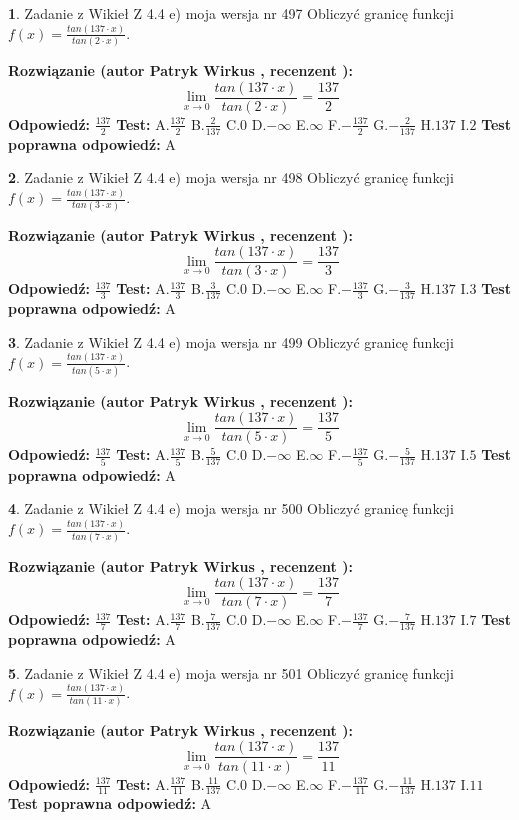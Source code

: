 \documentclass[12pt, a4paper]{article}
\theoremstyle{definition} %
\newtheorem{zad}{}
\newcommand{\zadStart}[1]{\begin{zad}#1\newline}
\newcommand{\zadStop}{\end{zad}}
\newcommand{\rozwStart}[2]{\noindent \textbf{Rozwiązanie (autor #1 , recenzent #2): }\newline}
\newcommand{\rozwStop}{\newline}
\newcommand{\odpStart}{\noindent \textbf{Odpowiedź:}\newline}
\newcommand{\odpStop}{\newline}
\newcommand{\testStart}{\noindent \textbf{Test:}\newline}
\newcommand{\testStop}{\newline}
\newcommand{\kluczStart}{\noindent \textbf{Test poprawna odpowiedź:}\newline}
\newcommand{\kluczStop}{\newline}
\begin{document}
\zadStart{Zadanie z Wikieł Z 4.4 e) moja wersja nr 497}
Obliczyć granicę funkcji $f(x)=\frac{tan(137\cdot x)}{tan(2\cdot x)}$.
\zadStop
\rozwStart{Patryk Wirkus}{}
$$\lim\limits_{x\to 0}\frac{tan(137\cdot x)}{tan(2\cdot x)}=
\frac{137}{2}$$
\rozwStop
\odpStart
$\frac{137}{2}$
\odpStop
\testStart
A.$\frac{137}{2}$
B.$\frac{2}{137}$
C.$0$
D.$-\infty$
E.$\infty$
F.$-\frac{137}{2}$
G.$-\frac{2}{137}$
H.$137$
I.$2$
\testStop
\kluczStart
A
\kluczStop



\zadStart{Zadanie z Wikieł Z 4.4 e) moja wersja nr 498}
Obliczyć granicę funkcji $f(x)=\frac{tan(137\cdot x)}{tan(3\cdot x)}$.
\zadStop
\rozwStart{Patryk Wirkus}{}
$$\lim\limits_{x\to 0}\frac{tan(137\cdot x)}{tan(3\cdot x)}=
\frac{137}{3}$$
\rozwStop
\odpStart
$\frac{137}{3}$
\odpStop
\testStart
A.$\frac{137}{3}$
B.$\frac{3}{137}$
C.$0$
D.$-\infty$
E.$\infty$
F.$-\frac{137}{3}$
G.$-\frac{3}{137}$
H.$137$
I.$3$
\testStop
\kluczStart
A
\kluczStop



\zadStart{Zadanie z Wikieł Z 4.4 e) moja wersja nr 499}
Obliczyć granicę funkcji $f(x)=\frac{tan(137\cdot x)}{tan(5\cdot x)}$.
\zadStop
\rozwStart{Patryk Wirkus}{}
$$\lim\limits_{x\to 0}\frac{tan(137\cdot x)}{tan(5\cdot x)}=
\frac{137}{5}$$
\rozwStop
\odpStart
$\frac{137}{5}$
\odpStop
\testStart
A.$\frac{137}{5}$
B.$\frac{5}{137}$
C.$0$
D.$-\infty$
E.$\infty$
F.$-\frac{137}{5}$
G.$-\frac{5}{137}$
H.$137$
I.$5$
\testStop
\kluczStart
A
\kluczStop



\zadStart{Zadanie z Wikieł Z 4.4 e) moja wersja nr 500}
Obliczyć granicę funkcji $f(x)=\frac{tan(137\cdot x)}{tan(7\cdot x)}$.
\zadStop
\rozwStart{Patryk Wirkus}{}
$$\lim\limits_{x\to 0}\frac{tan(137\cdot x)}{tan(7\cdot x)}=
\frac{137}{7}$$
\rozwStop
\odpStart
$\frac{137}{7}$
\odpStop
\testStart
A.$\frac{137}{7}$
B.$\frac{7}{137}$
C.$0$
D.$-\infty$
E.$\infty$
F.$-\frac{137}{7}$
G.$-\frac{7}{137}$
H.$137$
I.$7$
\testStop
\kluczStart
A
\kluczStop



\zadStart{Zadanie z Wikieł Z 4.4 e) moja wersja nr 501}
Obliczyć granicę funkcji $f(x)=\frac{tan(137\cdot x)}{tan(11\cdot x)}$.
\zadStop
\rozwStart{Patryk Wirkus}{}
$$\lim\limits_{x\to 0}\frac{tan(137\cdot x)}{tan(11\cdot x)}=
\frac{137}{11}$$
\rozwStop
\odpStart
$\frac{137}{11}$
\odpStop
\testStart
A.$\frac{137}{11}$
B.$\frac{11}{137}$
C.$0$
D.$-\infty$
E.$\infty$
F.$-\frac{137}{11}$
G.$-\frac{11}{137}$
H.$137$
I.$11$
\testStop
\kluczStart
A
\kluczStop
\end{document}
